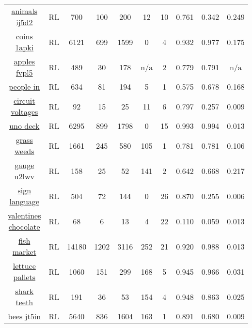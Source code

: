 \begin{longtable}{|| c | c | c c c | c c | c c c ||}
\cline{1-10}
\href{https://app.roboflow.com/roboflow-100/animals-ij5d2/1}{animals ij5d2} & RL & 700 & 100 & 200 & 12 & 10 & 0.761 & 0.342 & 0.249 \\
\cline{1-10}
\href{https://app.roboflow.com/roboflow-100/coins-1apki/1}{coins 1apki} & RL & 6121 & 699 & 1599 & 0 & 4 & 0.932 & 0.977 & 0.175 \\
\cline{1-10}
\href{https://app.roboflow.com/roboflow-100/apples-fvpl5/1}{apples fvpl5} & RL & 489 & 30 & 178 & n/a & 2 & 0.779 & 0.791 & n/a \\
\cline{1-10}
\href{https://app.roboflow.com/roboflow-100/people-in-paintings/1}{people in} & RL & 634 & 81 & 194 & 5 & 1 & 0.575 & 0.678 & 0.168 \\
\cline{1-10}
\href{https://app.roboflow.com/roboflow-100/circuit-voltages/1}{circuit voltages} & RL & 92 & 15 & 25 & 11 & 6 & 0.797 & 0.257 & 0.009 \\
\cline{1-10}
\href{https://app.roboflow.com/roboflow-100/uno-deck/1}{uno deck} & RL & 6295 & 899 & 1798 & 0 & 15 & 0.993 & 0.994 & 0.013 \\
\cline{1-10}
\href{https://app.roboflow.com/roboflow-100/grass-weeds/1}{grass weeds} & RL & 1661 & 245 & 580 & 105 & 1 & 0.781 & 0.781 & 0.106 \\
\cline{1-10}
\href{https://app.roboflow.com/roboflow-100/gauge-u2lwv/4}{gauge u2lwv} & RL & 158 & 25 & 52 & 141 & 2 & 0.642 & 0.668 & 0.217 \\
\cline{1-10}
\href{https://app.roboflow.com/roboflow-100/sign-language-sokdr/1}{sign language} & RL & 504 & 72 & 144 & 0 & 26 & 0.870 & 0.255 & 0.006 \\
\cline{1-10}
\href{https://app.roboflow.com/roboflow-100/valentines-chocolate/3}{valentines chocolate} & RL & 68 & 6 & 13 & 4 & 22 & 0.110 & 0.059 & 0.013 \\
\cline{1-10}
\href{https://app.roboflow.com/roboflow-100/fish-market-ggjso/5}{fish market} & RL & 14180 & 1202 & 3116 & 252 & 21 & 0.920 & 0.988 & 0.013 \\
\cline{1-10}
\href{https://app.roboflow.com/roboflow-100/lettuce-pallets/1}{lettuce pallets} & RL & 1060 & 151 & 299 & 168 & 5 & 0.945 & 0.966 & 0.031 \\
\cline{1-10}
\href{https://app.roboflow.com/roboflow-100/shark-teeth-5atku/1}{shark teeth} & RL & 191 & 36 & 53 & 154 & 4 & 0.948 & 0.863 & 0.025 \\
\cline{1-10}
\href{https://app.roboflow.com/roboflow-100/bees-jt5in/1}{bees jt5in} & RL & 5640 & 836 & 1604 & 163 & 1 & 0.891 & 0.680 & 0.009 \\

\end{longtable}

